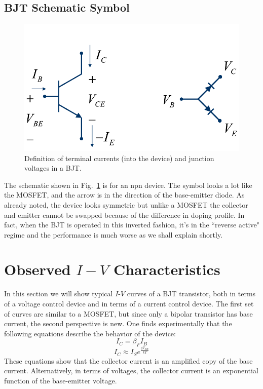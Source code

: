 \subsection{BJT Schematic Symbol}

\begin{figure}[tb]
\begin{center}
\includegraphics[width=.6\columnwidth]{slide5_bjt_schematic}
\end{center}
\caption{Definition of terminal currents (into the device) and junction voltages in a BJT.} \label{fig:slide5_bjt_schematic}
\end{figure}



The schematic shown in Fig.~\ref{fig:slide5_bjt_schematic} is for an npn device.  The symbol looks a lot like the MOSFET, and the arrow is in the direction of the base-emitter diode.  As already noted, the device looks symmetric but unlike a MOSFET the collector and emitter cannot be swapped because of the difference in doping profile. In fact, when the BJT is operated in this inverted fashion, it's in the ``reverse active" regime and the performance is much worse as we shall explain shortly. 


\section{Observed $I-V$ Characteristics}

In this section we will show typical $I$-$V$ curves of a BJT transistor, both in terms of a voltage control device and in terms of a current control device.  The first set of curves are similar to a MOSFET, but since only a bipolar transistor has base current, the second perspective is new.  One finds experimentally that the following equations describe the behavior of the device:
\begin{equation}
	{I_C} = \beta_F {I_B}
\end{equation}
%
\begin{equation}
	{I_C} \approx {I_S}{e^{\frac{{q{V_{BE}}}}{{kT}}}}
\end{equation}
%
These equations show that the collector current is an amplified copy of the base current.  Alternatively, in terms of voltages, the collector current is an exponential function of the base-emitter voltage.

